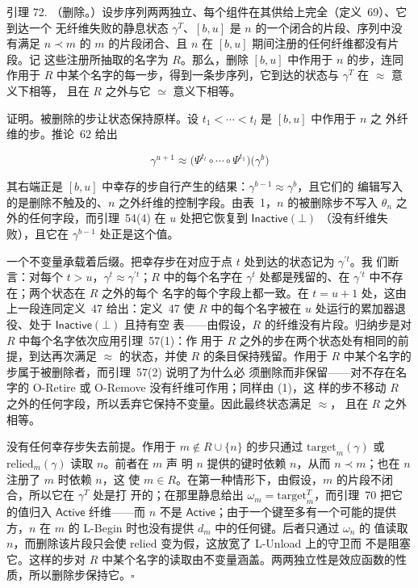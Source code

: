 \documentclass[
  10
]{article}
\begin{document}
引理 72. （删除。）设步序列两两独立、每个组件在其供给上完全（定义~69）、它到达一个
无纤维失败的静息状态 \(\gamma^{T}\)、\([b, u]\) 是 \(n\) 的一个闭合的片段、序列中没有满足
\(n \prec m\) 的 \(m\) 的片段闭合、且 \(n\) 在 \([b, u]\) 期间注册的任何纤维都没有片段。记
这些注册所抽取的名字为 \(R\)。那么，删除 \([b, u]\) 中作用于 \(n\) 的步，连同作用于 \(R\)
中某个名字的每一步，得到一条步序列，它到达的状态与 \(\gamma^{T}\) 在 \(\approx\) 意义下相等，
且在 \(R\) 之外与它 \(\simeq\) 意义下相等。

证明。被删除的步让状态保持原样。设 \(t_{1} < \cdots < t_{l}\) 是 \([b, u]\) 中作用于 \(n\) 之
外纤维的步。推论~62 给出

\[
\gamma^{u+1} \approx \bigl( \Psi^{t_{l}} \circ \cdots \circ \Psi^{t_{1}} \bigr) \bigl( \gamma^{b} \bigr)
\]

其右端正是 \([b, u]\) 中幸存的步自行产生的结果：\(\gamma^{b-1} \approx \gamma^{b}\)，且它们的
编辑写入的是删除不触及的、\(n\) 之外纤维的控制字段。由表~1，\(n\) 的被删除步不写入
\(\theta_{n}\) 之外的任何字段，而引理~54(4) 在 \(u\) 处把它恢复到 \(\mathsf{Inactive}(\bot)\)
（没有纤维失败），且它在 \(\gamma^{b-1}\) 处正是这个值。

一个不变量承载着后缀。把幸存步在对应于点 \(t\) 处到达的状态记为 \(\gamma^{\prime t}\)。我
们断言：对每个 \(t > u\)，\(\gamma^{t} \approx \gamma^{\prime t}\)；\(R\) 中的每个名字在
\(\gamma^{t}\) 处都是残留的、在 \(\gamma^{\prime t}\) 中不存在；两个状态在 \(R\) 之外的每个
名字的每个字段上都一致。在 \(t = u+1\) 处，这由上一段连同定义~47 给出：定义~47 使
\(R\) 中的每个名字被在 \(u\) 处运行的累加器退役、处于 \(\mathsf{Inactive}(\bot)\) 且持有空
表——由假设，\(R\) 的纤维没有片段。归纳步是对 \(R\) 中每个名字依次应用引理~57(1)：作
用于 \(R\) 之外的步在两个状态处有相同的前提，到达再次满足 \(\approx\) 的状态，并使 \(R\)
的条目保持残留。作用于 \(R\) 中某个名字的步属于被删除者，而引理~57(2) 说明了为什么必
须删除而非保留——对不存在名字的 O-Retire 或 O-Remove 没有纤维可作用；同样由 (1)，这
样的步不移动 \(R\) 之外的任何字段，所以丢弃它保持不变量。因此最终状态满足 \(\approx\)，
且在 \(R\) 之外相等。

没有任何幸存步失去前提。作用于 \(m \notin R \cup \{n\}\) 的步只通过
\(\mathrm{target}_{m}(\gamma)\) 或 \(\mathrm{relied}_{m}(\gamma)\) 读取 \(n\)。前者在 \(m\) 声
明 \(n\) 提供的键时依赖 \(n\)，从而 \(n \prec m\)；也在 \(n\) 注册了 \(m\) 时依赖 \(n\)，这
使 \(m \in R\)。在第一种情形下，由假设，\(m\) 的片段不闭合，所以它在 \(\gamma^{T}\) 处是打
开的；在那里静息给出 \(\omega_{m} = \mathrm{target}_{m}^{T}\)，而引理~70 把它的值归入
\(\mathsf{Active}\) 纤维——而 \(n\) 不是 \(\mathsf{Active}\)；由于一个键至多有一个可能的提供
方，\(n\) 在 \(m\) 的 L-Begin 时也没有提供 \(d_{m}\) 中的任何键。后者只通过 \(\omega_{n}\) 的
值读取 \(n\)，而删除该片段只会使 \(\mathrm{relied}\) 变为假，这放宽了 L-Unload 上的守卫而
不是阻塞它。这样的步对 \(R\) 中某个名字的读取由不变量涵盖。两两独立性是效应函数的性
质，所以删除步保持它。\(\square\)
\end{document}
